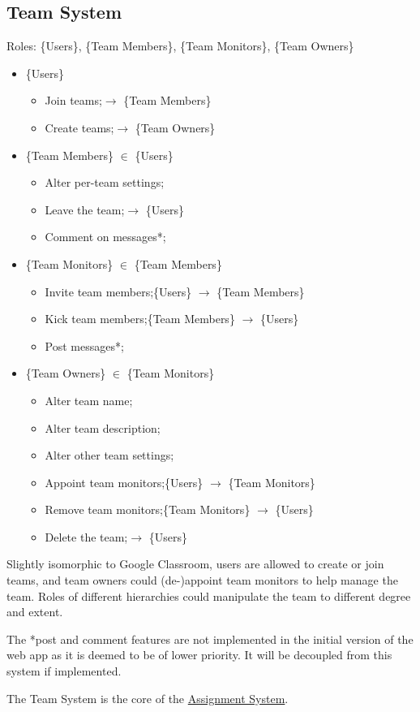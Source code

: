\documentclass[12pt]{report}
\newcommand{\n}{\par}
\newcommand{\br}{\vspace{1 em}\n}
\begin{document}
\subsection{Team System}\label{overview.project-objectives.team-system}
Roles: \{Users\}, \{Team Members\}, \{Team Monitors\}, \{Team Owners\}\n
\begin{itemize}
	\item \{Users\}
	      \begin{itemize}
		      \item Join teams;\null\hfill $\rightarrow$ \{Team Members\}
		      \item Create teams;\null\hfill $\rightarrow$ \{Team Owners\}
	      \end{itemize}
	\item \{Team Members\} $\in$ \{Users\}
	      \begin{itemize}
		      \item Alter per-team settings;
		      \item Leave the team;\null\hfill $\rightarrow$ \{Users\}
		      \item Comment on messages*;
	      \end{itemize}
	\item \{Team Monitors\} $\in$ \{Team Members\}
	      \begin{itemize}
		      \item Invite team members;\null\hfill \{Users\} $\rightarrow$ \{Team Members\}
		      \item Kick team members;\null\hfill \{Team Members\} $\rightarrow$ \{Users\}
		      \item Post messages*;
	      \end{itemize}
	\item \{Team Owners\} $\in$ \{Team Monitors\}
	      \begin{itemize}
		      \item Alter team name;
		      \item Alter team description;
		      \item Alter other team settings;
		      \item Appoint team monitors;\null\hfill \{Users\} $\rightarrow$ \{Team Monitors\}
		      \item Remove team monitors;\null\hfill \{Team Monitors\} $\rightarrow$ \{Users\}
		      \item Delete the team;\null\hfill $\rightarrow$ \{Users\}
	      \end{itemize}
\end{itemize}\n
Slightly isomorphic to Google Classroom,
users are allowed to create or join teams, and team owners could (de-)appoint team monitors to help manage the team.
Roles of different hierarchies could manipulate the team to different degree and extent.
\br
The *post and comment features are not implemented in the initial version of the web app
as it is deemed to be of lower priority. It will be decoupled from this system if implemented.
\br
The Team System is the core of the \hyperref[overview.project-objectives.assignment-system]{Assignment System}.
\newpage
\end{document}
